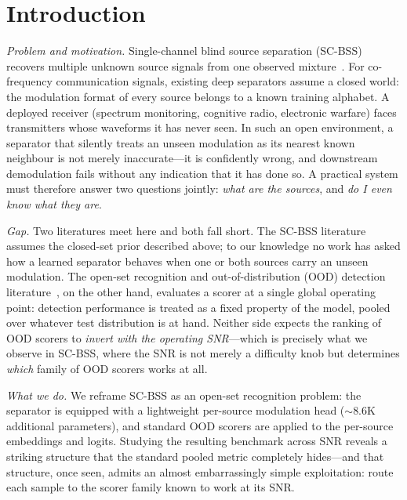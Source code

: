 \documentclass[review,12pt]{elsarticle}
\begin{document}
\linenumbers

\section{Introduction}
\label{sec:intro}

\emph{Problem and motivation.} Single-channel blind source separation
(SC-BSS) recovers multiple unknown source signals from one observed
mixture~\cite{hou2022single,guo2024single}. For co-frequency
communication signals, existing deep separators assume a closed world:
the modulation format of every source belongs to a known training
alphabet. A deployed receiver (spectrum monitoring, cognitive radio,
electronic warfare) faces transmitters whose waveforms it has never
seen. In such an open environment, a separator that silently treats an
unseen modulation as its nearest known neighbour is not merely
inaccurate---it is confidently wrong, and downstream demodulation fails
without any indication that it has done so. A practical system must
therefore answer two questions jointly: \emph{what are the sources}, and
\emph{do I even know what they are}.

\emph{Gap.} Two literatures meet here and both fall short. The SC-BSS
literature assumes the closed-set prior described above; to our
knowledge no work has asked how a learned separator behaves when one or
both sources carry an unseen modulation. The open-set recognition and
out-of-distribution (OOD) detection
literature~\cite{bendale2016openmax,hendrycks2017msp,liang2018odin,liu2020energy},
on the other hand, evaluates a scorer at a single global operating
point: detection performance is treated as a fixed property of the
model, pooled over whatever test distribution is at hand. Neither side
expects the ranking of OOD scorers to \emph{invert with the operating
SNR}---which
is precisely what we observe in SC-BSS, where the SNR is not merely a
difficulty knob but determines \emph{which} family of OOD scorers works
at all.

\emph{What we do.} We reframe SC-BSS as an open-set recognition problem:
the separator is equipped with a lightweight per-source modulation head
($\sim$8.6K additional parameters), and standard OOD scorers are applied
to the per-source embeddings and logits. Studying the resulting
benchmark across SNR reveals a striking structure that the standard
pooled metric completely hides---and that structure, once seen, admits
an almost embarrassingly simple exploitation: route each sample to the
scorer family known to work at its SNR.
\end{document}
